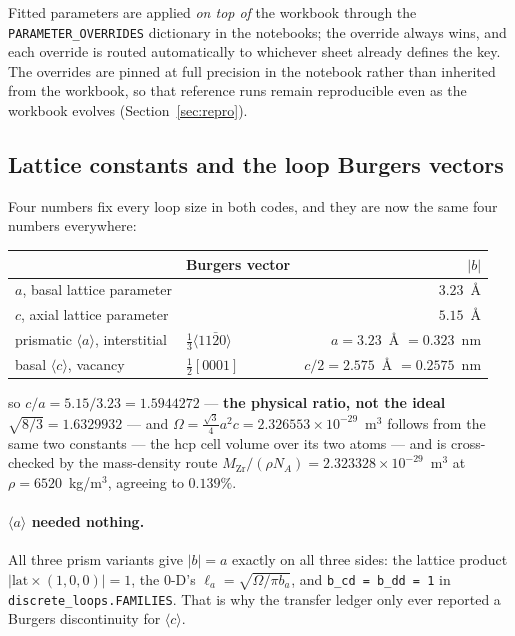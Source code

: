 \documentclass[11pt]{article}
\newcommand{\aloop}{\ensuremath{\langle a\rangle}}
\newcommand{\cloop}{\ensuremath{\langle c\rangle}}
\newcommand{\code}[1]{\texttt{\small #1}}
\begin{document}
Fitted parameters are applied \emph{on top of} the workbook through the
\code{PARAMETER\_OVERRIDES} dictionary in the notebooks; the override always
wins, and each override is routed automatically to whichever sheet already
defines the key. The overrides are pinned at full precision in the notebook
rather than inherited from the workbook, so that reference runs remain
reproducible even as the workbook evolves
(Section~\ref{sec:repro}).

\subsection{Lattice constants and the loop Burgers vectors}
\label{sec:burgers}

Four numbers fix every loop size in both codes, and they are now the same four
numbers everywhere:

\begin{center}
\begin{tabular}{@{}llr@{}}
\toprule
 & Burgers vector & $|b|$ \\
\midrule
$a$, basal lattice parameter    &                     & $3.23$~\AA{} \\
$c$, axial lattice parameter    &                     & $5.15$~\AA{} \\
prismatic \aloop{}, interstitial & $\frac13\langle11\bar{2}0\rangle$ & $a = 3.23$~\AA{} $= 0.323$~nm \\
basal \cloop{}, vacancy          & $\frac12[0001]$                   & $c/2 = 2.575$~\AA{} $= 0.2575$~nm \\
\bottomrule
\end{tabular}
\end{center}

so $c/a = 5.15/3.23 = 1.5944272$ --- \textbf{the physical ratio, not the ideal
$\sqrt{8/3} = 1.6329932$} --- and
$\Omega = \frac{\sqrt3}{4}a^2c = 2.326553\times10^{-29}$~m$^3$ follows from the
same two constants --- the hcp cell volume over its two atoms --- and is
cross-checked by the mass-density route
$M_{\mathrm{Zr}}/(\rho N_A) = 2.323328\times10^{-29}$~m$^3$ at
$\rho = 6520$~kg/m$^3$, agreeing to $0.139\%$.

\paragraph{\aloop{} needed nothing.} All three prism variants give
$|b| = a$ exactly on all three sides: the lattice product
$|\mathrm{lat}\times(1,0,0)| = 1$, the 0-D's $\ell_a = \sqrt{\Omega/\pi b_a}$,
and \code{b\_cd = b\_dd = 1} in \code{discrete\_loops.FAMILIES}. That is why the
transfer ledger only ever reported a Burgers discontinuity for \cloop{}.
\end{document}
